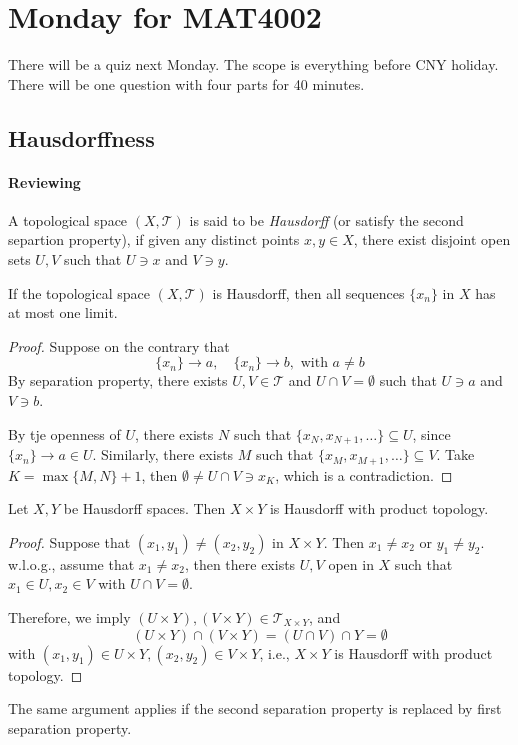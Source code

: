 \section{Monday for MAT4002}
There will be a quiz next Monday. The scope is everything before CNY holiday. There will be one question with four parts for 40 minutes.
\subsection{Hausdorffness}
\paragraph{Reviewing}
A topological space $(X,\mathcal{T})$ is said to be \emph{Hausdorff} (or satisfy the second separtion property), if given any distinct points $x,y\in X$, there exist disjoint open sets $U,V$ such that $U\ni x$ and $V\ni y$.

\begin{proposition}
If the topological space $(X,\mathcal{T})$ is Hausdorff,
then all sequences $\{x_n\}$ in $X$ has at most one limit.
\end{proposition}
\begin{proof}
Suppose on the contrary that 
\[
\{x_n\}\to a,\quad
\{x_n\}\to b,\text{ with }a\ne b
\]
By separation property, there exists 
$U,V\in\mathcal{T}$ and $U\cap V=\emptyset$ 
such that $U\ni a$ and $V\ni b$.

By tje openness of $U$, there exists $N$ such that $\{x_N,x_{N+1},\dots\}\subseteq U$, since $\{x_n\}\to a\in U$. Similarly, there exists $M$ such that $\{x_M,x_{M+1},\dots\}\subseteq V$. Take $K=\max\{M,N\}+1$, then $\emptyset\ne U\cap V\ni x_K$, which is a contradiction.
\end{proof}

\begin{proposition}
Let $X,Y$ be Hausdorff spaces. Then $X\times Y$ is Hausdorff with product topology.
\end{proposition}
\begin{proof}
Suppose that $(x_1,y_1)\ne (x_2,y_2)$ in $X\times Y$.
Then $x_1\ne x_2$ or $y_1\ne y_2$.
w.l.o.g., assume that $x_1\ne x_2$, then there exists $U,V$ open in $X$ such that
$x_1\in U, x_2\in V$ with $U\cap V=\emptyset$.

Therefore, we imply $(U\times Y), (V\times Y)\in\mathcal{T}_{X\times Y}$, and
\[
(U\times Y)\cap(V\times Y) = (U\cap V)\cap Y=\emptyset
\]
with $(x_1,y_1)\in U\times Y, (x_2,y_2)\in V\times Y$, i.e., $X\times Y$ is Hausdorff with product topology.
\end{proof}
The same argument applies if the second separation property is replaced by first separation property.

